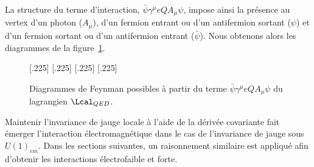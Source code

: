 La structure du terme d'interaction, $\bar{\psi}\gamma^\mu eQA_\mu \psi$, impose ainsi la présence au vertex d'un photon ($A_\mu$), d'un fermion entrant ou d'un antifermion sortant ($\psi$) et d'un fermion sortant ou d'un antifermion entrant ($\bar{\psi}$). Nous obtenons alors les diagrammes de la figure~\ref{fig-fgraph-ff_Gamma}.
\begin{figure}[h]
\centering
\vspace{\baselineskip}
[.225\textwidth]
{\vspace{\baselineskip}}
\hfill
{}[.225\textwidth]
{\vspace{\baselineskip}}
\hfill
{}[.225\textwidth]
{\vspace{\baselineskip}}
\hfill
{}[.225\textwidth]
{\vspace{\baselineskip}}

\caption{Diagrammes de Feynman possibles à partir du terme $\bar{\psi}\gamma^\mu eQA_\mu \psi$ du lagrangien $\Lcal_{QED}$.}
\label{fig-fgraph-ff_Gamma}
\end{figure}


\par Maintenir l'invariance de jauge locale à l'aide de la dérivée covariante fait émerger l'interaction électromagnétique dans le cas de l'invariance de jauge sous $U(1)_{em}$.  Dans les sections suivantes, un raisonnement similaire est appliqué afin d'obtenir les interactions électrofaible et forte.